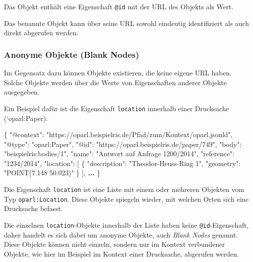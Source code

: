 \documentclass[,a4paper]{article}
\newenvironment{Shaded}{}{}
\newcommand{\DataTypeTok}[1]{\textcolor[rgb]{0.56,0.13,0.00}{{#1}}}
\newcommand{\StringTok}[1]{\textcolor[rgb]{0.25,0.44,0.63}{{#1}}}
\newcommand{\OtherTok}[1]{\textcolor[rgb]{0.00,0.44,0.13}{{#1}}}
\newcommand{\FunctionTok}[1]{\textcolor[rgb]{0.02,0.16,0.49}{{#1}}}
\newcommand{\ErrorTok}[1]{\textcolor[rgb]{1.00,0.00,0.00}{\textbf{{#1}}}}
\begin{document}
Das Objekt enthält eine Eigenschaft \texttt{@id} mit der URL des Objekts
als Wert.

Das benannte Objekt kann über seine URL sowohl eindeutig identifiziert
als auch direkt abgerufen werden.

\subsubsection{Anonyme Objekte (Blank Nodes)}\label{anonymeux5fobjekte}

Im Gegensatz dazu können Objekte existieren, die keine eigene URL haben.
Solche Objekte werden über die Werte von Eigenschaften anderer Objekte
ausgegeben.

Ein Beispiel dafür ist die Eigenschaft \texttt{location} innerhalb einer
Drucksache (`oparl:Paper):

\begin{Shaded}
\begin{Highlighting}[]
\FunctionTok{\{}
    \DataTypeTok{"@context"}\FunctionTok{:} \StringTok{"https://oparl.beispielris.de/Pfad/zum/Kontext/oparl.jsonld"}\FunctionTok{,}
    \DataTypeTok{"@type"}\FunctionTok{:} \StringTok{"oparl:Paper"}\FunctionTok{,}
    \DataTypeTok{"@id"}\FunctionTok{:} \StringTok{"https://oparl.beispielris.de/paper/749"}\FunctionTok{,}
    \DataTypeTok{"body"}\FunctionTok{:} \StringTok{"beispielris:bodies/1"}\FunctionTok{,}
    \DataTypeTok{"name"}\FunctionTok{:} \StringTok{"Antwort auf Anfrage 1200/2014"}\FunctionTok{,}
    \DataTypeTok{"reference"}\FunctionTok{:} \StringTok{"1234/2014"}\FunctionTok{,}
    \DataTypeTok{"location"}\FunctionTok{:} \OtherTok{[}
        \FunctionTok{\{}
            \DataTypeTok{"description"}\FunctionTok{:} \StringTok{"Theodor-Heuss-Ring 1"}\FunctionTok{,}
            \DataTypeTok{"geometry"}\FunctionTok{:} \StringTok{"POINT(7.148  50.023)"}
        \FunctionTok{\}}
    \OtherTok{]}\FunctionTok{,}
    \ErrorTok{...}
\FunctionTok{\}}
\end{Highlighting}
\end{Shaded}

Die Eigenschaft \texttt{location} ist eine Liste mit einem oder mehreren
Objekten vom Typ \texttt{oparl:Location}. Diese Objekte spiegeln wieder,
mit welchen Orten sich eine Drucksache befasst.

Die einzelnen \texttt{location}-Objekte innerhalb der Liste haben keine
\texttt{@id}-Eigenschaft, daher handelt es sich dabei um anonyme
Objekte, auch \emph{Blank Nodes} genannt. Diese Objekte können nicht
einzeln, sondern nur im Kontext verbundener Objekte, wie hier im
Beispiel im Kontext einer Drucksache, abgerufen werden.
\end{document}

